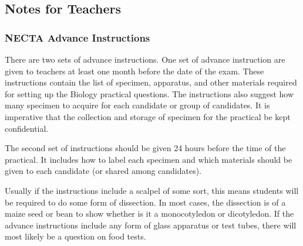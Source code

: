 \subsection{Notes for Teachers}

\subsubsection{NECTA Advance Instructions}
There are two sets of advance instructions. One set of advance instruction are given to teachers at least one month before the date of the exam. These instructions contain the list of specimen, apparatus, and other materials required for setting up the Biology practical questions. The instructions also suggest how many specimen to acquire for each candidate or group of candidates. It is imperative that the collection and storage of specimen for the practical be kept confidential.

The second set of instructions should be given 24 hours before the time of the practical. It includes how to label each specimen and which materials should be given to each candidate (or shared among candidates).

Usually if the instructions include a scalpel of some sort, this means students will be required to do some form of dissection. In most cases, the dissection is of a maize seed or bean to show whether is it a monocotyledon or dicotyledon. If the advance instructions include any form of glass apparatus or test tubes, there will most likely be a question on food tests.





